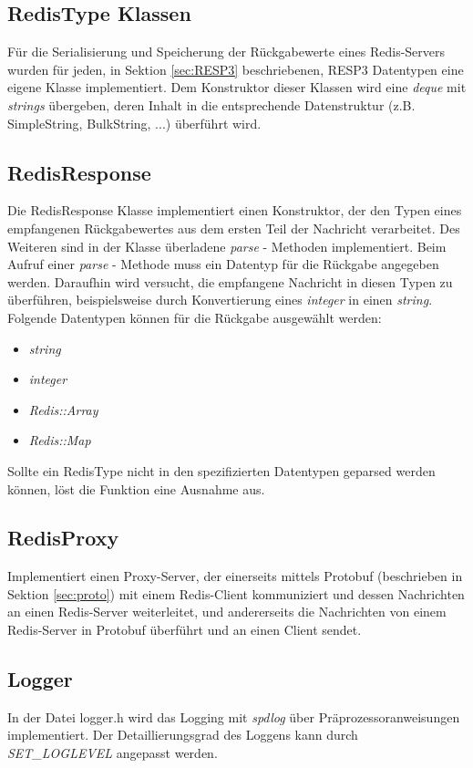 \documentclass[12pt, letterpaper]{article}
\begin{document}
\subsection{RedisType Klassen}
Für die Serialisierung und Speicherung der Rückgabewerte eines Redis-Servers wurden für jeden, in Sektion \ref{sec:RESP3} beschriebenen, RESP3 Datentypen eine eigene Klasse implementiert.
Dem Konstruktor dieser Klassen wird eine \textit{deque} mit \textit{strings} übergeben, deren Inhalt in die entsprechende Datenstruktur (z.B. SimpleString, BulkString, ...) überführt wird.

\subsection{RedisResponse}
Die RedisResponse Klasse implementiert einen Konstruktor, der den Typen eines empfangenen Rückgabewertes aus dem ersten Teil der Nachricht verarbeitet. Des Weiteren sind in der Klasse überladene \textit{parse} - Methoden implementiert. Beim Aufruf einer \textit{parse} - Methode muss ein Datentyp für die Rückgabe angegeben werden. Daraufhin wird versucht, die empfangene Nachricht in diesen Typen zu überführen, beispielsweise durch Konvertierung eines \textit{integer} in einen \textit{string}. Folgende Datentypen können für die Rückgabe ausgewählt werden: 
\begin{itemize}
    \item \textit{string}
    \item \textit{integer}
    \item \textit{Redis::Array}
    \item \textit{Redis::Map}
\end{itemize}
Sollte ein RedisType nicht in den spezifizierten Datentypen geparsed werden können, löst die Funktion eine Ausnahme aus.

\subsection{RedisProxy}
Implementiert einen Proxy-Server, der einerseits mittels Protobuf (beschrieben in Sektion \ref{sec:proto}) mit einem Redis-Client kommuniziert und dessen Nachrichten an einen Redis-Server weiterleitet, und andererseits die Nachrichten von einem Redis-Server in Protobuf überführt und an einen Client sendet.

\subsection{Logger}
In der Datei logger.h wird das Logging mit \textit{spdlog} über Präprozessoranweisungen implementiert. Der Detaillierungsgrad des Loggens kann durch \textit{SET\_LOGLEVEL} angepasst werden.
\end{document}
